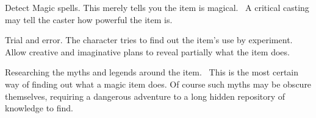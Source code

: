 Detect Magic spells. This merely tells you the item is magical.  A critical casting may tell the caster how powerful the item is.

Trial and error. The character tries to find out the item’s use by experiment. Allow creative and imaginative plans to reveal partially what the item does.

Researching the myths and legends around the item.  This is the most certain way of finding out what a magic item does. Of course such myths may be obscure themselves, requiring a dangerous adventure to a long hidden repository of knowledge to find.
